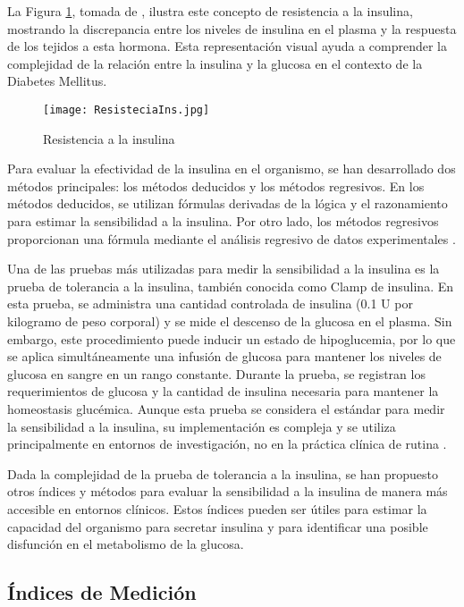 La Figura \ref{fig:Resistencia}, tomada de \cite{ImgResis}, ilustra este concepto de resistencia a la insulina, mostrando la discrepancia entre los niveles de insulina en el plasma y la respuesta de los tejidos a esta hormona. Esta representación visual ayuda a comprender la complejidad de la relación entre la insulina y la glucosa en el contexto de la Diabetes Mellitus.

\begin{figure}[H]
    \centering
    \texttt{[image: ResisteciaIns.jpg]}
    \caption{Resistencia a la insulina}
    \label{fig:Resistencia}
\end{figure}

Para evaluar la efectividad de la insulina en el organismo, se han desarrollado dos métodos principales: los métodos deducidos y los métodos regresivos. En los métodos deducidos, se utilizan fórmulas derivadas de la lógica y el razonamiento para estimar la sensibilidad a la insulina. Por otro lado, los métodos regresivos proporcionan una fórmula mediante el análisis regresivo de datos experimentales \cite{MedicionEstimacion}.

Una de las pruebas más utilizadas para medir la sensibilidad a la insulina es la prueba de tolerancia a la insulina, también conocida como Clamp de insulina. En esta prueba, se administra una cantidad controlada de insulina (0.1 U por kilogramo de peso corporal) y se mide el descenso de la glucosa en el plasma. Sin embargo, este procedimiento puede inducir un estado de hipoglucemia, por lo que se aplica simultáneamente una infusión de glucosa para mantener los niveles de glucosa en sangre en un rango constante. Durante la prueba, se registran los requerimientos de glucosa y la cantidad de insulina necesaria para mantener la homeostasis glucémica. Aunque esta prueba se considera el estándar para medir la sensibilidad a la insulina, su implementación es compleja y se utiliza principalmente en entornos de investigación, no en la práctica clínica de rutina \cite{MedicionEstimacion}.

Dada la complejidad de la prueba de tolerancia a la insulina, se han propuesto otros índices y métodos para evaluar la sensibilidad a la insulina de manera más accesible en entornos clínicos. Estos índices pueden ser útiles para estimar la capacidad del organismo para secretar insulina y para identificar una posible disfunción en el metabolismo de la glucosa.

\subsection{Índices de Medición}

